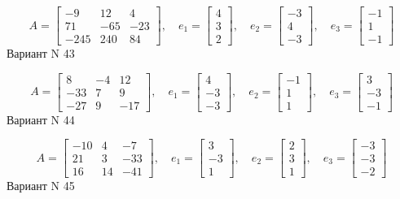 \documentclass[11pt]{report}
\begin{document}
$$A = \left[\begin{matrix}-9 & 12 & 4\\71 & -65 & -23\\-245 & 240 & 84\end{matrix}\right],\quad e_1 = \left[\begin{matrix}4\\3\\2\end{matrix}\right],\quad e_2 = \left[\begin{matrix}-3\\4\\-3\end{matrix}\right],\quad e_3 = \left[\begin{matrix}-1\\1\\-1\end{matrix}\right]$$Вариант N 43

$$A = \left[\begin{matrix}8 & -4 & 12\\-33 & 7 & 9\\-27 & 9 & -17\end{matrix}\right],\quad e_1 = \left[\begin{matrix}4\\-3\\-3\end{matrix}\right],\quad e_2 = \left[\begin{matrix}-1\\1\\1\end{matrix}\right],\quad e_3 = \left[\begin{matrix}3\\-3\\-1\end{matrix}\right]$$Вариант N 44

$$A = \left[\begin{matrix}-10 & 4 & -7\\21 & 3 & -33\\16 & 14 & -41\end{matrix}\right],\quad e_1 = \left[\begin{matrix}3\\-3\\1\end{matrix}\right],\quad e_2 = \left[\begin{matrix}2\\3\\1\end{matrix}\right],\quad e_3 = \left[\begin{matrix}-3\\-3\\-2\end{matrix}\right]$$Вариант N 45
\end{document}
